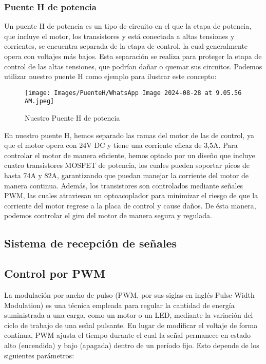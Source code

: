 \documentclass{article}
\begin{document}
\subsubsection{Puente H de potencia}
Un puente H de potencia es un tipo de circuito en el que la etapa de potencia, que incluye el motor, los transistores y está conectada a altas tensiones y corrientes, se encuentra separada de la etapa de control, la cual generalmente opera con voltajes más bajos. Esta separación se realiza para proteger la etapa de control de las altas tensiones, que podrían dañar o quemar sus circuitos. Podemos utilizar nuestro puente H como ejemplo para ilustrar este concepto:

 \begin{figure}[H]
     \centering
     \texttt{[image: Images/PuenteH/WhatsApp Image 2024-08-28 at 9.05.56 AM.jpeg]}
     \caption{Nuestro Puente H de potencia}
     \label{fig:enter-label}
 \end{figure}

En nuestro puente H, hemos separado las ramas del motor de las de control, ya que el motor opera con 24V DC y tiene una corriente eficaz de 3,5A. Para controlar el motor de manera eficiente, hemos optado por un diseño que incluye cuatro transistores MOSFET de potencia, los cuales pueden soportar picos de hasta 74A y 82A, garantizando que puedan manejar la corriente del motor de manera continua. Además, los transistores son controlados mediante señales PWM, las cuales atraviesan un optoacoplador para minimizar el riesgo de que la corriente del motor regrese a la placa de control y cause daños. De ésta manera, podemos controlar el giro del motor de manera segura y regulada.


\subsection{Sistema de recepción de señales}

\subsection{Control por PWM}
La modulación por ancho de pulso (PWM, por sus siglas en inglés Pulse Width Modulation) es una técnica empleada para regular la cantidad de energía suministrada a una carga, como un motor o un LED, mediante la variación del ciclo de trabajo de una señal pulsante. En lugar de modificar el voltaje de forma continua, PWM ajusta el tiempo durante el cual la señal permanece en estado alto (encendida) y bajo (apagada) dentro de un período fijo. Esto depende de los siguientes parámetros:
\end{document}
